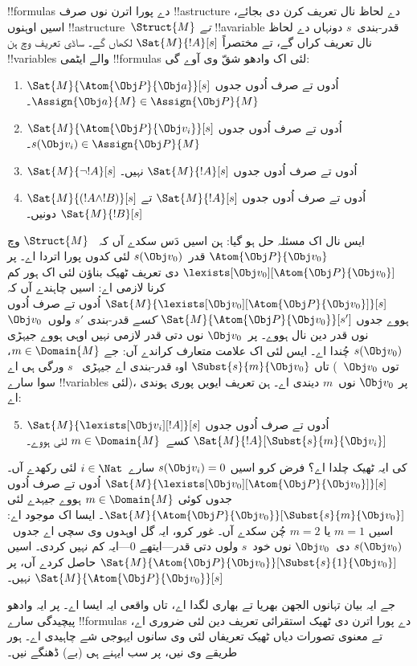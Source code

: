 \documentclass[../../../include/open-logic-section]{subfiles}
\begin{document}
!!{formula}s دے پورا اترن نوں
صرف !!a{structure} دے لحاظ نال
تعریف کرن دی بجائے، اسیں اوہنوں
!!a{structure}~$\Struct{M}$
\emph{تے} !!a{variable}
قدر-بندی~$s$ دونہاں دے
لحاظ نال تعریف کراں گے،
تے مختصراً $\Sat{M}{!A}[s]$
لکھاں گے۔ ساڈی تعریف وچ
ہن !!{variable}s والے
ایٹمی !!{formula}s لئی
اک وادھو شقّ وی آوے گی:
\begin{enumerate}
  \item $\Sat{M}{\Atom{\Obj P}{\Obj a}}[s]$
  اُدوں تے صرف اُدوں جدوں
  $\Assign{\Obj a}{M} \in \Assign{\Obj P}{M}$۔
  \item $\Sat{M}{\Atom{\Obj P}{\Obj v_i}}[s]$
  اُدوں تے صرف اُدوں جدوں
  $s(\Obj v_i) \in \Assign{\Obj P}{M}$۔
  \item $\Sat{M}{\lnot !A}[s]$
  اُدوں تے صرف اُدوں جدوں
  $\Sat{M}{!A}[s]$ نہیں۔
  \item $\Sat{M}{(!A \land !B)}[s]$
  اُدوں تے صرف اُدوں جدوں
  $\Sat{M}{!A}[s]$ تے
  $\Sat{M}{!B}[s]$ دونیں۔
\end{enumerate}
ایس نال اک مسئلہ حل ہو گیا:
ہن اسیں دَس سکدے آں کہ
~$\Struct{M}$ وچ
$\Atom{\Obj P}{\Obj v_0}$
قدر~$s(\Obj v_0)$ لئی
کدوں پورا اتردا اے۔
پر $\lexists[\Obj v_0][\Atom{\Obj P}{\Obj
v_0}]$ دی تعریف ٹھیک بناؤن
لئی اک ہور کم کرنا لازمی اے:
اسیں چاہندے آں کہ
$\Sat{M}{\lexists[\Obj v_0][\Atom{\Obj P}{\Obj v_0}]}[s]$
اُدوں تے صرف اُدوں ہووے
جدوں $\Sat{M}{\Atom{\Obj P}{\Obj v_0}}[s']$
\emph{کسے} قدر-بندی $s'$
ولوں~$\Obj v_0$ نوں قدر دین
نال ہووے۔
پر~$\Obj v_0$ نوں دتی
قدر لازمی نہیں اوہی ہووے
جیہڑی $s(\Obj v_0)$
چُندا اے۔ ایس لئی اک
علامت متعارف کراندے آں:
جے $m \in \Domain{M}$،
تاں $\Subst{s}{m}{\Obj v_0}$
اوہ قدر-بندی اے جیہڑی
~$s$ ورگی ہی اے
(~$\Obj v_0$ توں سوا
سارے !!{variable}s لئی)،
پر $\Obj v_0$ نوں~$m$
دیندی اے۔ ہن تعریف ایویں
پوری ہوندی اے:
\begin{enumerate}\setcounter{enumi}{4}
  \item $\Sat{M}{\lexists[\Obj v_i][!A]}[s]$
  اُدوں تے صرف اُدوں جدوں
  $\Sat{M}{!A}[\Subst{s}{m}{\Obj v_i}]$
  کسے~$m \in \Domain{M}$ لئی ہووے۔
\end{enumerate}
کی ایہ ٹھیک چلدا اے؟
فرض کرو اسیں $s(\Obj v_i) = 0$
سارے~$i \in \Nat$ لئی رکھدے آں۔
$\Sat{M}{\lexists[\Obj v_0][\Atom{\Obj P}{\Obj v_0}]}[s]$
اُدوں تے صرف اُدوں
جدوں کوئی $m \in \Domain{M}$
ہووے جیہدے لئی
$\Sat{M}{\Atom{\Obj P}{\Obj
v_0}}[\Subst{s}{m}{\Obj v_0}]$۔
ایسا اک موجود اے:
اسیں $m = 1$ یا
$m = 2$ چُن سکدے آں۔
غور کرو، ایہ گل اوہدوں
وی سچی اے جدوں~$s(\Obj v_0)$
دی~$\Obj v_0$ نوں خود~$s$
ولوں دتی قدر---ایتھے
$0$---ایہ کم نہیں کردی۔
اسیں
$\Sat{M}{\Atom{\Obj P}{\Obj v_0}}[\Subst{s}{1}{\Obj
v_0}]$ حاصل کردے آں،
پر $\Sat{M}{\Atom{\Obj P}{\Obj v_0}}[s]$
نہیں۔

جے ایہ بیان تہانوں
الجھن بھریا تے بھاری
لگدا اے، تاں واقعی
ایہ ایسا اے۔ پر ایہ
وادھو پیچیدگی سارے
!!{formula}s دے پورا
اترن دی ٹھیک استقرائی
تعریف دین لئی ضروری اے،
تے معنوی تصورات دیاں
ٹھیک تعریفاں لئی وی
سانوں ایہوجی شے
چاہیدی اے۔ ہور طریقے
وی نیں، پر سب ایہنے
ہی (بے) ڈھنگے نیں۔
\end{document}
